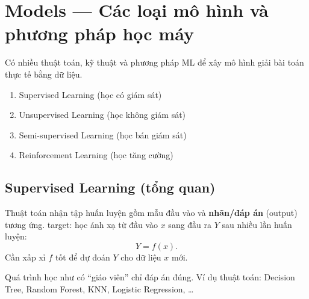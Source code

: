 \section{Models --- Các loại mô hình và phương pháp học máy}
\label{sec:mo-hinh-ml}

\begin{dongco}[title={Nhiều cách xây mô hình từ dữ liệu}]
Có nhiều thuật toán, kỹ thuật và phương pháp ML để xây mô hình giải bài toán thực tế bằng dữ liệu.
\end{dongco}

\begin{vidu}[title={Tổng quan các kiểu học máy}]
\end{vidu}

\begin{phuongphap}[title={Bốn loại phương pháp ML (theo mức giám sát)}]
\begin{enumerate}
  \item Supervised Learning (học có giám sát)
  \item Unsupervised Learning (học không giám sát)
  \item Semi-supervised Learning (học bán giám sát)
  \item Reinforcement Learning (học tăng cường)
\end{enumerate}
\end{phuongphap}

\subsection{Supervised Learning (tổng quan)}

\begin{dinhnghia}[title={Học có giám sát}]
Thuật toán nhận tập huấn luyện gồm mẫu đầu vào và \textbf{nhãn/đáp án} (output) tương ứng.
target: học ánh xạ từ đầu vào $x$ sang đầu ra $Y$ sau nhiều lần huấn luyện:
\[
Y = f(x).
\]
Cần xấp xỉ $f$ tốt để dự đoán $Y$ cho dữ liệu $x$ mới.
\end{dinhnghia}

\begin{ynghia}[title={``Có giám sát''}]
Quá trình học như có ``giáo viên'' chỉ đáp án đúng.
Ví dụ thuật toán: Decision Tree, Random Forest, KNN, Logistic Regression, \ldots
\end{ynghia}

